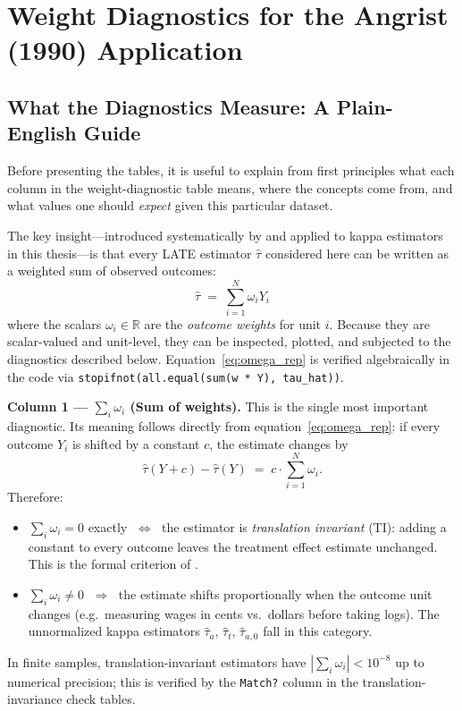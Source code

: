 \documentclass[12pt, a4paper]{article}
\begin{document}
\section*{Weight Diagnostics for the Angrist (1990) Application}

\subsection*{What the Diagnostics Measure: A Plain-English Guide}

Before presenting the tables, it is useful to explain from first principles
what each column in the weight-diagnostic table means, where the concepts come
from, and what values one should \emph{expect} given this particular dataset.

The key insight---introduced systematically by \citet{knaus2024outcome} and
applied to kappa estimators in this thesis---is that every LATE estimator
$\hat{\tau}$ considered here can be written as a weighted sum of observed
outcomes:
%
\begin{equation}
  \hat{\tau} \;=\; \sum_{i=1}^{N} \omega_i Y_i
  \label{eq:omega_rep}
\end{equation}
%
where the scalars $\omega_i \in \mathbb{R}$ are the \emph{outcome weights}
for unit $i$. Because they are scalar-valued and unit-level, they can be
inspected, plotted, and subjected to the diagnostics described below.
Equation~\eqref{eq:omega_rep} is verified algebraically in the code via
\texttt{stopifnot(all.equal(sum(w * Y), tau\_hat))}.

\bigskip
\noindent\textbf{Column 1 --- $\sum_i \omega_i$ (Sum of weights).}
This is the single most important diagnostic. Its meaning follows directly
from equation~\eqref{eq:omega_rep}: if every outcome $Y_i$ is shifted by a
constant $c$, the estimate changes by
%
\begin{equation}
  \hat{\tau}(Y + c) - \hat{\tau}(Y) \;=\; c \cdot \sum_{i=1}^{N} \omega_i.
\end{equation}
%
Therefore:
\begin{itemize}
  \item $\sum_i \omega_i = 0$ exactly $\;\Leftrightarrow\;$ the estimator is
        \emph{translation invariant} (TI): adding a constant to every outcome
        leaves the treatment effect estimate unchanged. This is the formal
        criterion of \citet[][Prop.~3.2]{sloczyn2025kappa}.
  \item $\sum_i \omega_i \neq 0$ $\;\Rightarrow\;$ the estimate shifts
        proportionally when the outcome unit changes (e.g.\ measuring wages
        in cents vs.\ dollars before taking logs). The unnormalized kappa
        estimators $\hat{\tau}_a$, $\hat{\tau}_t$, $\hat{\tau}_{a,0}$ fall
        in this category.
\end{itemize}
In finite samples, translation-invariant estimators have
$|\sum_i \omega_i| < 10^{-8}$ up to numerical precision; this is verified
by the \texttt{Match?} column in the translation-invariance check tables.
\end{document}
